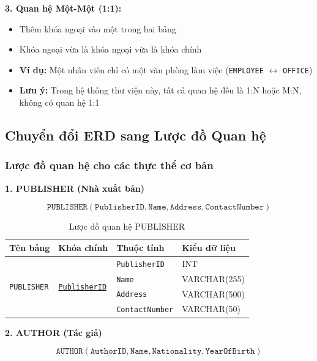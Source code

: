 \documentclass[12pt,a4paper]{article}
\newcommand{\entity}[1]{\texttt{#1}}
\begin{document}
\textbf{3. Quan hệ Một-Một (1:1):}

\begin{itemize}
    \item Thêm khóa ngoại vào một trong hai bảng
    \item Khóa ngoại vừa là khóa ngoại vừa là khóa chính
    \item \textbf{Ví dụ:} Một nhân viên chỉ có một văn phòng làm việc (\entity{EMPLOYEE} $\leftrightarrow$ \entity{OFFICE})
    \item \textbf{Lưu ý:} Trong hệ thống thư viện này, tất cả quan hệ đều là 1:N hoặc M:N, không có quan hệ 1:1
\end{itemize}

\subsection{Chuyển đổi ERD sang Lược đồ Quan hệ}

\subsubsection{Lược đồ quan hệ cho các thực thể cơ bản}

\textbf{1. PUBLISHER (Nhà xuất bản)}

$$
\texttt{PUBLISHER}(\underline{\texttt{PublisherID}}, \texttt{Name}, \texttt{Address}, \texttt{ContactNumber})
$$

\begin{table}[H]
\centering
\caption{Lược đồ quan hệ PUBLISHER}
\begin{tabular}{@{}|l|l|l|l|@{}}
\hline
\textbf{Tên bảng} & \textbf{Khóa chính} & \textbf{Thuộc tính} & \textbf{Kiểu dữ liệu} \\ \hline
\multirow{4}{*}{\texttt{PUBLISHER}} & \multirow{4}{*}{\underline{\texttt{PublisherID}}} & \texttt{PublisherID} & INT \\ \cline{3-4}
& & \texttt{Name} & VARCHAR(255) \\ \cline{3-4}
& & \texttt{Address} & VARCHAR(500) \\ \cline{3-4}
& & \texttt{ContactNumber} & VARCHAR(50) \\ \hline
\end{tabular}
\end{table}

\textbf{2. AUTHOR (Tác giả)}

$$
\texttt{AUTHOR}(\underline{\texttt{AuthorID}}, \texttt{Name}, \texttt{Nationality}, \texttt{YearOfBirth})
$$
\end{document}
